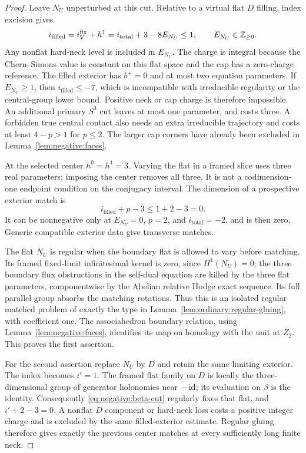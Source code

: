 \begin{proof}
Leave $N_U$ unperturbed at this cut.  Relative to a virtual flat
$D$ filling, index excision gives
\begin{equation}\label{eq:negative:zero-replacement-index}
 i_{\mathrm{filled}}
   =i_V^{\mathrm{fix}}+h^1
   =i_{\mathrm{total}}+3-8E_{N_U}\le1,
 \qquad E_{N_U}\in\mathbb Z_{\ge0}.
\end{equation}
Any nonflat hard-neck level is included in $E_{N_U}$.  The charge is
integral because the Chern--Simons value is constant on this flat
space and the cap has a zero-charge reference.  The filled exterior
has $b^+=0$ and at most two equation parameters.  If $E_{N_U}\ge1$,
then $i_{\mathrm{filled}}\le-7$, which is incompatible with
irreducible regularity or the central-group lower bound.  Positive
neck or cap charge is therefore impossible.  An additional primary
$S^3$ cut leaves at most one parameter, and costs three.  A forbidden
true central contact also needs an extra irreducible trajectory and
costs at least $4-p>1$ for $p\le2$.  The larger cap corners have
already been excluded in Lemma~\ref{lem:negative:faces}.

At the selected center $h^0=h^1=3$.  Varying the flat in a framed
slice uses three real parameters; imposing the center removes all
three.  It is not a codimension-one endpoint condition on the
conjugacy interval.  The dimension of a prospective exterior match is
\[
 i_{\mathrm{filled}}+p-3\le1+2-3=0.
\]
It can be nonnegative only at $E_{N_U}=0$, $p=2$, and
$i_{\mathrm{total}}=-2$, and is then zero.  Generic compatible
exterior data give transverse matches.

The flat $N_U$ is regular when the boundary flat is allowed to vary
before matching.  Its framed fixed-limit infinitesimal kernel is
zero, since $H^1(N_U)=0$; the three boundary flux obstructions in
the self-dual equation are killed by the three flat parameters,
componentwise by the Abelian relative Hodge exact sequence.  Its full
parallel group absorbs the matching rotations.  Thus this is an
isolated regular matched problem of exactly the type in
Lemma~\ref{lem:ordinary:regular-gluing}, with coefficient one.
The associahedron boundary relation, using
Lemma~\ref{lem:negative:faces}, identifies its map on homology with
the unit at $Z_2$.  This proves the first assertion.

For the second assertion replace $N_U$ by $D$ and retain the same
limiting exterior.  The index becomes $i'=1$.  The framed flat
family on $D$ is locally the three-dimensional group of generator
holonomies near $-\operatorname{id}$; its evaluation on $\beta$ is the identity.
Consequently \eqref{eq:negative:beta-cut} regularly fixes that flat,
and $i'+2-3=0$.  A nonflat $D$ component or hard-neck loss costs
a positive integer charge and is excluded by the same filled-exterior
estimate.  Regular gluing therefore gives exactly the previous
center matches at every sufficiently long finite neck.


\end{proof}
